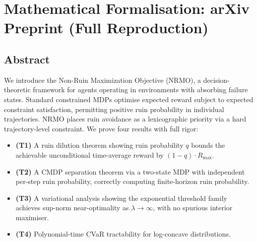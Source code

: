 
\chapter{Mathematical Formalisation: arXiv Preprint
(Full Reproduction)}
\label{ch:arxiv-formalisation}



\section*{Abstract}
\label{sec:arxiv-abstract}

We introduce the Non-Ruin Maximization Objective (NRMO), a
decision-theoretic framework for agents operating in environments
with absorbing failure states. Standard constrained MDPs optimise
expected reward subject to expected constraint satisfaction,
permitting positive ruin probability in individual trajectories.
NRMO places ruin avoidance as a lexicographic priority via a hard
trajectory-level constraint. We prove four results with full rigor:

\begin{itemize}
\item \textbf{(T1)} A ruin dilution theorem showing ruin probability
$q$ bounds the achievable unconditional time-average reward by
$(1 - q) \cdot R_{\max}$.
\item \textbf{(T2)} A CMDP separation theorem via a two-state MDP
with independent per-step ruin probability, correctly computing
finite-horizon ruin probability.
\item \textbf{(T3)} A variational analysis showing the exponential
threshold family achieves sup-norm near-optimality as $\lambda
\to \infty$, with no spurious interior maximiser.
\item \textbf{(T4)} Polynomial-time CVaR tractability for log-concave
distributions.
\end{itemize}

